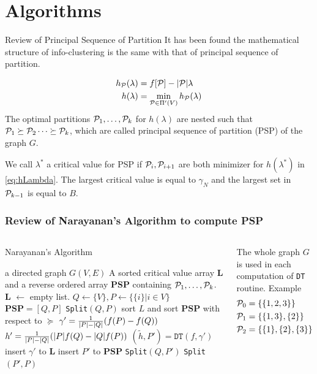 \documentclass[notheorems]{beamer}
\begin{document}
\section{Algorithms}
\frame{\tableofcontents[currentsection]}
\begin{frame}{Review of Principal Sequence of Partition}
It has been found the mathematical structure of info-clustering is the same with that of principal sequence of partition.
\begin{definition}
\begin{align}
h_{\P}(\lambda) &=  f[\P] - \abs{\P} \lambda  \label{eq:hPL}\\
h(\lambda) &= \min_{\P \in \Pi'(V)} h_{\P}(\lambda) \label{eq:hLambda}
\end{align}
The optimal partitions $\P_1, \dots, \P_k$ for $h(\lambda)$ are nested such that $\P_1 \succeq \P_2 \dots \succeq \P_k$,  which are called principal sequence of partition (PSP) of the graph $G$.
\end{definition}
We call $\lambda^*$ a critical value for PSP if $\P_i, \P_{i+1}$ are both minimizer for $h(\lambda^*)$ in \eqref{eq:hLambda}.
The largest critical value is equal to $\gamma_N$ and the largest set in $\P_{k-1}$ is equal to $B$.
\end{frame}
\begin{frame}
\frametitle{Review of Narayanan's Algorithm to compute PSP}
\begin{columns}
\begin{algorithm}[H]
\caption*{Narayanan's Algorithm}\label{alg:psp}
{\tiny
\begin{algorithmic}[1]
\REQUIRE a directed graph $G(V,E)$
\ENSURE A sorted critical value array \textbf{L} and a reverse ordered array \textbf{PSP} containing $\P_1,\dots, \P_k$.
\STATE \textbf{L}  $\leftarrow$ empty list.
\STATE $Q\leftarrow \{V\}, P \leftarrow \{ \{i \} | i \in V\}$
\STATE $\mathbf{PSP}= [Q, P]$
\STATE \texttt{Split}$(Q,P)$
\STATE sort $L$ and sort $\mathbf{PSP}$ with respect to $\succeq$ 
 \STATE\label{alg:gamma} $\gamma' = {1 \over \abs{P} - \abs{Q}} (f(P)-f(Q))$
 \STATE $h' = {1 \over \abs{P} - \abs{Q}}(\abs{P} f(Q) - \abs{Q} f(P))$
 \STATE $(\tilde{h}, P') = \texttt{DT}(f,\gamma')$
 	\STATE insert $\gamma'$ to $\mathbf{L}$
 \ELSE
 	\STATE insert $P'$ to $\mathbf{PSP}$
 	\STATE \texttt{Split}$(Q, P')$
 	\STATE \texttt{Split}$(P',P)$
 \ENDIF
\ENDFUNCTION
\end{algorithmic}
}
\end{algorithm}
The whole graph $G$ is used in each computation of \texttt{DT} routine.
Example
\begin{align*}
\P_0  & = \{\{1,2,3\}\} \\
\P_1  & = \{\{1,3\},\{2\}\} \\
\P_2  & = \{\{1\},\{2\},\{3\}\} 
\end{align*}
\end{columns}
\end{frame}
\end{document}
